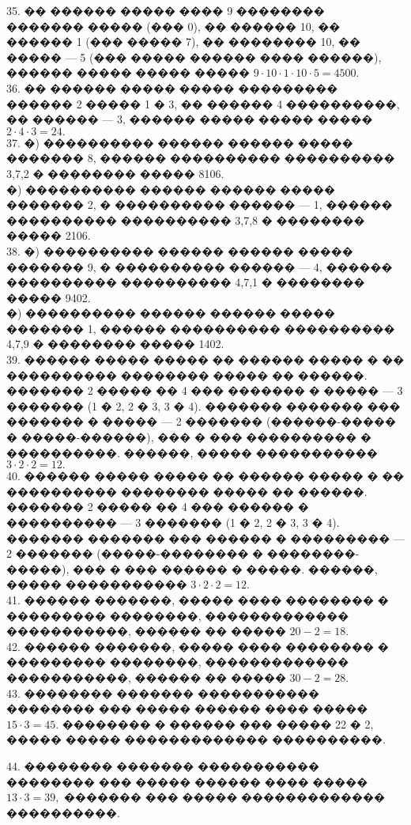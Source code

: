 \documentclass[12pt]{article}
\begin{document}
35. �� ������ ����� ���� 9 �������� ������� ����� (��� 0), �� ������ 10, �� ������ 1 (��� ����� 7), �� �������� 10, �� ����� --- 5 (��� ����� ������ ���� ������), ������ ����� ����� ����� $9\cdot10\cdot1\cdot10\cdot5=4500.$\\
36. �� ������ ����� ����� ��������� ������ 2 ����� 1 � 3, �� ������ 4 ����������, �� ������ --- 3, ������ ����� ����� ����� $2\cdot4\cdot3=24.$\\
37. �) ���������� ������ ������ ����� ������� 8, ������ ���������� ���������� 3,7,2 � �������� ����� 8106.\\
�) ���������� ������ ������ ����� ������� 2, � ���������� ������ --- 1, ������ ���������� ���������� 3,7,8 � �������� ����� 2106.\\
38. �) ���������� ������ ������ ����� ������� 9, � ���������� ������ --- 4, ������ ���������� ���������� 4,7,1 � �������� ����� 9402.\\
�) ���������� ������ ������ ����� ������� 1, ������ ���������� ���������� 4,7,9 � �������� ����� 1402.\\
39. ������ ����� ����� �� ������ ����� � �� ���������� �������� ����� �� ������. ������� 2 ����� �� 4 ��� ������� � ����� --- 3 ������� (1 � 2, 2 � 3, 3 � 4). ������� ������� ��� ������� � ����� --- 2 ������� (������-����� � �����-������), ��� � ���  ���������� � ����������. ������, ����� ����������� $3\cdot2\cdot2=12.$\\
40. ������ ����� ����� �� ������ ����� � �� ���������� �������� ����� �� ������. ������� 2 ����� �� 4 ��� ������ � ���������� --- 3 ������� (1 � 2, 2 � 3, 3 � 4). ������� ������� ��� ������ � ��������� --- 2 ������� (�����-�������� � ��������-�����), ��� � ���  ������ � �����. ������, ����� ����������� $3\cdot2\cdot2=12.$\\
41. ������ �������, ����� ���� �������� � ��������� ��������, ������������� �����������, ������ �� ����� $20-2=18.$\\
42. ������ �������, ����� ���� �������� � ��������� ��������, ������������� �����������, ������ �� ����� $30-2=28.$\\
43. �������� ������� ����������� �������� ��� ����� ������ ���� ����� $15\cdot3=45.$ �������� � ������ ��� ����� 22 � 2, ����� ����� ������������� ����������.
\begin{center}
\begin{figure}[ht!]
\end{figure}
\end{center}
44. �������� ������� ����������� �������� ��� ����� ������ ���� ����� $13\cdot3=39,$ ������� ��� ����� ������������� ����������.
\end{document}
